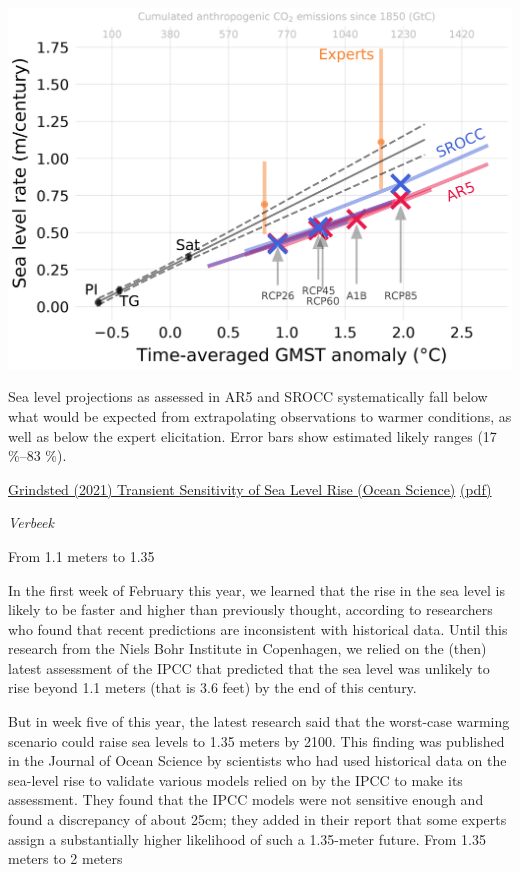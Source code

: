 \documentclass[
]{book}
\begin{document}
\includegraphics{fig/Transient_Sea_Level_Sensitivity.png}

Sea level projections as assessed in AR5 and SROCC systematically fall
below what would be expected from extrapolating observations to
warmer conditions, as well as below the expert elicitation. Error
bars show estimated likely ranges (17 \%--83 \%).

\href{https://os.copernicus.org/articles/17/181/2021/}{Grindsted (2021) Transient Sensitivity of Sea Level Rise (Ocean Science)}
\href{pdf/Grindsted_2021_Transient_Sensitivity_of_Sea_Level_Rise.pdf}{(pdf)}

\emph{Verbeek}

From 1.1 meters to 1.35

In the first week of February this year, we learned that the rise in the sea level is likely to be faster and higher than previously thought, according to researchers who found that recent predictions are inconsistent with historical data. Until this research from the Niels Bohr Institute in Copenhagen, we relied on the (then) latest assessment of the IPCC that predicted that the sea level was unlikely to rise beyond 1.1 meters (that is 3.6 feet) by the end of this century.

But in week five of this year, the latest research said that the worst-case warming scenario could raise sea levels to 1.35 meters by 2100. This finding was published in the Journal of Ocean Science by scientists who had used historical data on the sea-level rise to validate various models relied on by the IPCC to make its assessment. They found that the IPCC models were not sensitive enough and found a discrepancy of about 25cm; they added in their report that some experts assign a substantially higher likelihood of such a 1.35-meter future.
From 1.35 meters to 2 meters
\end{document}
